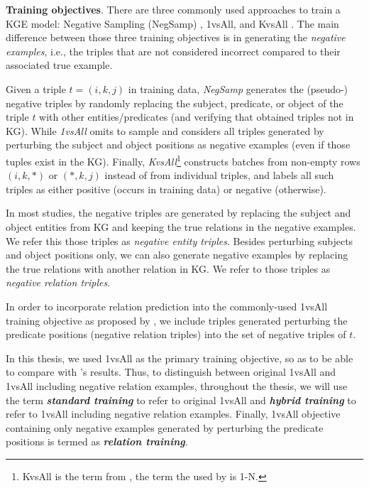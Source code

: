 \noindent\textbf{Training objectives}. There are three commonly used approaches to train a KGE model: Negative Sampling (NegSamp) \citep{bordes2013translating}, 1vsAll, \citep{lacroix2018canonical} and KvsAll \citep{dettmers2018conve}. The main difference between those three training objectives is in generating the \textit{negative examples}, i.e., the triples that are not considered incorrect compared to their associated true example. 

Given a triple $t = (i,k,j)$ in training data, \textit{NegSamp} generates the (pseudo-) negative triples by randomly replacing the subject, predicate, or object of the triple $t$ with other entities/predicates (and verifying that obtained triples not in KG). While \textit{1vsAll} omits to sample and considers all triples generated by perturbing the subject and object positions as negative examples (even if those tuples exist in the KG). Finally, \textit{KvsAll}\footnote{KvsAll is the term from \citet{Ruffinelli2020You}, the term the used by \citet{dettmers2018conve} is 1-N.} constructs batches from non-empty rows $(i,k,*)$ or $(*,k,j)$ instead of from individual triples, and labels all such triples as either positive (occurs in training data) or negative (otherwise).

In most studies, the negative triples are generated by replacing the subject and object entities from KG and keeping the true relations in the negative examples. We refer this those triples as \textit{negative entity triples}. Besides perturbing subjects and object positions only, we can also generate negative examples by replacing the true relations with another relation in KG. We refer to those triples as \textit{negative relation triples}.

In order to incorporate relation prediction into the commonly-used 1vsAll training objective as proposed by \cite{chen2021relation}, we include triples generated perturbing the predicate positions (negative relation triples) into the set of negative triples of $t$. 
 
In this thesis, we used 1vsAll as the primary training objective, so as to be able to compare with \citet{chen2021relation}'s results. Thus, to distinguish between original 1vsAll and 1vsAll including negative relation examples, throughout the thesis, we will use the term \textbf{\textit{standard training}} to refer to original 1vsAll and \textbf{\textit{hybrid training}} to refer to 1vsAll including negative relation examples. Finally, 1vsAll objective containing only negative examples generated by perturbing the predicate positions is termed as \textbf{\textit{relation training}}.
\newline

